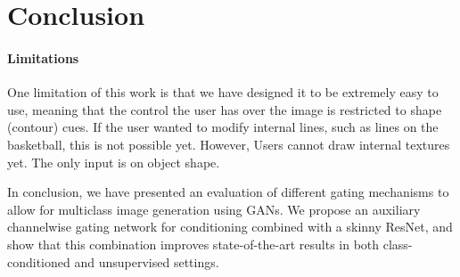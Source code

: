 

\section{Conclusion}

\paragraph{Limitations}
One limitation of this work is that we have designed it to be extremely easy to use, meaning that the control the user has over the image is restricted to shape (contour) cues. 
If the user wanted to modify internal lines, such as lines on the basketball, this is not possible yet. 
However, Users cannot draw internal textures yet. The only input is on object shape.

\noindent In conclusion, we have presented an evaluation of different gating mechanisms to allow for multiclass image generation using GANs. 
We propose an auxiliary channelwise gating network for conditioning combined with a skinny ResNet, and show that this combination improves state-of-the-art results in both class-conditioned and unsupervised settings.



